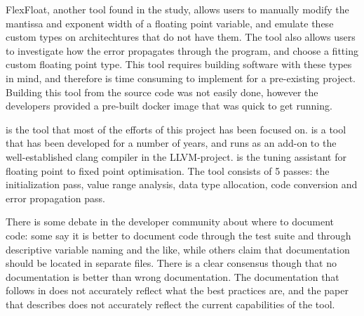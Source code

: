 

FlexFloat, another tool found in the study, allows users to manually modify the mantissa and exponent width of a floating point variable, and emulate these custom types on architechtures that do not have them. The tool also allows users to investigate how the error propagates through the program, and choose a fitting custom floating point type. This tool requires building software with these types in mind, and therefore is time consuming to implement for a pre-existing project. Building this tool from the source code was not easily done, however the developers provided a pre-built docker image that was quick to get running.


\taffo{} is the tool that most of the efforts of this project has been focused on. \taffo{} is a tool that has been developed for a number of years, and runs as an add-on to the well-established clang compiler in the LLVM-project.
\taffo{} is the tuning assistant for floating point to fixed point optimisation. The tool consists of 5 passes: the initialization pass, value range analysis, data type allocation, code conversion and error propagation pass.

There is some debate in the developer community about where to document code: some say it is better to document code through the test suite and through descriptive variable naming and the like, while others claim that documentation should be located in separate files. There is a clear consensus though that no documentation is better than wrong documentation.
The documentation that follows in \taffo{} does not accurately reflect what the best practices are, and the paper that describes \taffo{} does not accurately reflect the current capabilities of the tool.

